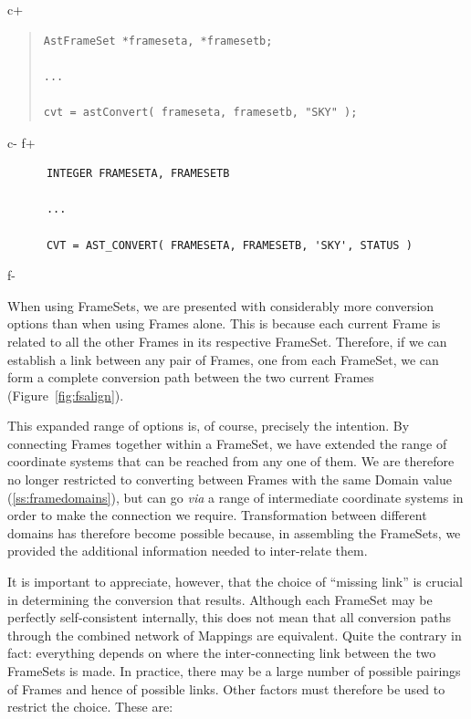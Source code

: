 \documentclass[twoside,11pt]{article}
\newcommand{\secref}[1]{\S\ref{#1}}
\renewcommand{\secref}[1]{\ref{#1}}
\begin{document}
c+
\begin{quote}
\small
\begin{verbatim}
AstFrameSet *frameseta, *framesetb;

...

cvt = astConvert( frameseta, framesetb, "SKY" );
\end{verbatim}
\normalsize
\end{quote}
c-
f+
\small
\begin{verbatim}
      INTEGER FRAMESETA, FRAMESETB

      ...

      CVT = AST_CONVERT( FRAMESETA, FRAMESETB, 'SKY', STATUS )
\end{verbatim}
\normalsize
f-

When using FrameSets, we are presented with considerably more
conversion options than when using Frames alone. This is because each
current Frame is related to all the other Frames in its respective
FrameSet. Therefore, if we can establish a link between any pair of
Frames, one from each FrameSet, we can form a complete conversion path
between the two current Frames (Figure~\ref{fig:fsalign}).

This expanded range of options is, of course, precisely the
intention. By connecting Frames together within a FrameSet, we have
extended the range of coordinate systems that can be reached from any
one of them.  We are therefore no longer restricted to converting
between Frames with the same Domain value (\secref{ss:framedomains}),
but can go {\em{via}} a range of intermediate coordinate systems in
order to make the connection we require. Transformation between
different domains has therefore become possible because, in assembling
the FrameSets, we provided the additional information needed to
inter-relate them.

It is important to appreciate, however, that the choice of ``missing
link'' is crucial in determining the conversion that results.
Although each FrameSet may be perfectly self-consistent internally,
this does not mean that all conversion paths through the combined
network of Mappings are equivalent. Quite the contrary in fact:
everything depends on where the inter-connecting link between the two
FrameSets is made.  In practice, there may be a large number of
possible pairings of Frames and hence of possible links. Other factors
must therefore be used to restrict the choice. These are:
\end{document}
